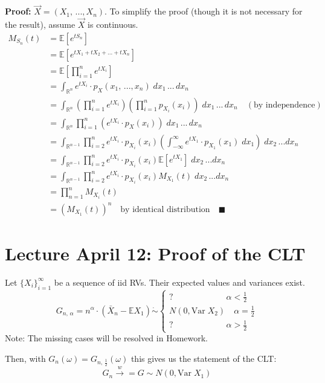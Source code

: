 \documentclass[12pt]{article}
\newcommand{\R}{\mathbb{R}}
\newcommand{\E}{\mathbb{E}}
\newcommand{\Var}{\text{Var}\;}
\begin{document}
\textbf{Proof:} $\vec{X} = (X_1, \, ..., X_n)$. To simplify the proof (though it is not necessary for the result), assume $\vec{X}$ is continuous. 
\begin{align*}
    M_{S_n}(t) &=\E[e^{tS_n}] \\
    &= \E\left[e^{t X_1 + tX_2+ ... + tX_n}\right]\\
    &= \E \left[\prod_{i=1}^n e^{tX_i}\right]\\
    &= \int_{\R^n} e^{tX_i} \cdot p_X(x_1, \, ..., x_n)\; dx_1\, ...\, dx_n\\
    &= \int_{\R^n} \left(\prod_{i=1}^n e^{tX_i}\right)\left(\prod_{i=1}^n p_{X_i}(x_i)\right)\; dx_1\, ...\, dx_n \quad (\text{by independence})\\
    &= \int_{\R^n} \prod_{i=1}^n \left(e^{tX_i} \cdot p_X(x_i)\right)\; dx_1\, ...\, dx_n\\
    &= \int_{\R^{n-1}} \prod_{i=2}^n e^{tX_i} \cdot p_{X_i}(x_i)\left(\int_{-\infty}^{\infty} e^{tX_1}\cdot p_{X_1}(x_1)\; dx_1\right)\; dx_2\, ... dx_n\\
    &= \int_{\R^{n-1}} \prod_{i=2}^n e^{tX_i} \cdot p_{X_i}(x_i)\E[e^{tX_1}]\; dx_2\, ... dx_n\\
    &= \int_{\R^{n-1}} \prod_{i=2}^n e^{tX_i} \cdot p_{X_i}(x_i)M_{X_1}(t)\; dx_2\, ... dx_n\\
    &= \prod_{n=1}^n M_{X_i}(t)\\
    &= \left(M_{X_1}(t)\right)^n \quad \text{by identical distribution} \quad \blacksquare
\end{align*} 

\section*{Lecture April 12: Proof of the CLT}
Let $\{X_i\}_{i=1}^\infty$ be a sequence of iid RVs. Their expected values and variances exist. 
\[G_{n,\, \alpha} = n^\alpha \cdot (\bar{X}_n - \E X_1) \dot \sim \begin{cases}
    ? \qquad \qquad\qquad\; \alpha < \frac{1}{2}\\
    N(0, \Var X_2) \quad \alpha = \frac{1}{2}\\
    ? \qquad \qquad \qquad \; \alpha > \frac{1}{2}
\end{cases}\]
Note: The missing cases will be resolved in Homework. 

Then, with $G_n(\omega) = G_{n, \, \frac{1}{2}}(\omega)$ this gives us the statement of the CLT:
\[G_n \overset{w}{\to} = G \sim N(0, \Var X_1)\]
\end{document}
